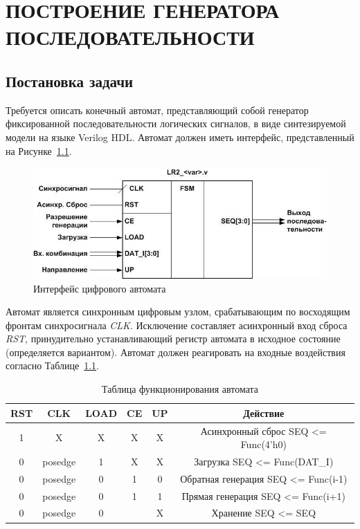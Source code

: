 \chapter{ПОСТРОЕНИЕ ГЕНЕРАТОРА ПОСЛЕДОВАТЕЛЬНОСТИ}
\label{cha:lab2}
	
\section {Постановка задачи}
Требуется описать конечный автомат, представляющий собой генератор
фиксированной последовательности логических сигналов, в виде синтезируемой модели
на языке Verilog HDL.
Автомат должен иметь интерфейс, представленный на Рисунке~\ref{fig:fsmexample}.

\begin{figure}[h!]
	\centering
	\includegraphics[width=0.6\linewidth]{course-plis/images/lab2/fsm_example}
	\caption{Интерфейс цифрового автомата}
	\label{fig:fsmexample}
\end{figure}


Автомат является синхронным цифровым узлом, срабатывающим по восходящим
фронтам синхросигнала \textit{CLK}. Исключение составляет асинхронный вход сброса \textit{RST},
принудительно устанавливающий регистр автомата в исходное состояние (определяется
вариантом).
Автомат должен реагировать на входные воздействия согласно Таблице~\ref{tab:fsm state}.


\begin{table}[h!]
	\centering
		\caption{Таблица функционирования автомата}
		\small
	\begin{tabular}{|c|c|c|c|c|c|}
		\hline
		\textbf{RST}  & \textbf{CLK}  & \textbf{LOAD}  & \textbf{CE}  & \textbf{UP}  & \textbf{Действие} \\ \hline \hline
		1 & X  & X  & X  & X  & Асинхронный сброс SEQ <= Func(4'h0) \\ \hline
		0 & posedge & 1 & X  & X  & Загрузка SEQ <= Func(DAT\_I) \\ \hline
		0 & posedge & 0 & 1 & 0 & Обратная генерация SEQ <= Func(i-1) \\ \hline
		0 & posedge & 0 & 1 & 1 & Прямая генерация SEQ <= Func(i+1) \\ \hline
		0 & posedge & 0 &  & X  & Хранение SEQ <= SEQ \\ \hline
	\end{tabular}
	\label{tab:fsm state}
\end{table}


